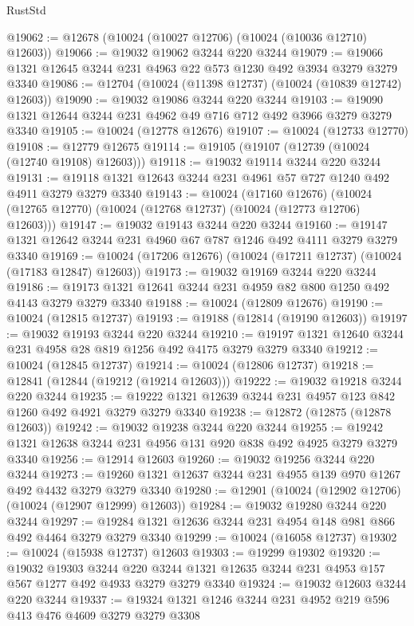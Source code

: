 \begin{lexlean}{RustStd}
\begin{coremodule}
{\begin{coremodule}
{{{{{{{{{{{{{{{{{{{{{{{{{{@19062 := @12678 (@10024 (@10027 @12706) (@10024 (@10036 @12710) @12603))
@19066 := @19032 @19062 @3244 @220 @3244
@19079 := @19066 @1321 @12645 @3244 @231 @4963 @22 @573 @1230 @492 @3934 @3279 @3279 @3340
@19086 := @12704 (@10024 (@11398 @12737) (@10024 (@10839 @12742) @12603))
@19090 := @19032 @19086 @3244 @220 @3244
@19103 := @19090 @1321 @12644 @3244 @231 @4962 @49 @716 @712 @492 @3966 @3279 @3279 @3340
@19105 := @10024 (@12778 @12676)
@19107 := @10024 (@12733 @12770)
@19108 := @12779 @12675
@19114 := @19105 (@19107 (@12739 (@10024 (@12740 @19108) @12603)))
@19118 := @19032 @19114 @3244 @220 @3244
@19131 := @19118 @1321 @12643 @3244 @231 @4961 @57 @727 @1240 @492 @4911 @3279 @3279 @3340
@19143 := @10024
    (@17160 @12676)
    (@10024 (@12765 @12770) (@10024 (@12768 @12737) (@10024 (@12773 @12706) @12603)))
@19147 := @19032 @19143 @3244 @220 @3244
@19160 := @19147 @1321 @12642 @3244 @231 @4960 @67 @787 @1246 @492 @4111 @3279 @3279 @3340
@19169 := @10024 (@17206 @12676) (@10024 (@17211 @12737) (@10024 (@17183 @12847) @12603))
@19173 := @19032 @19169 @3244 @220 @3244
@19186 := @19173 @1321 @12641 @3244 @231 @4959 @82 @800 @1250 @492 @4143 @3279 @3279 @3340
@19188 := @10024 (@12809 @12676)
@19190 := @10024 (@12815 @12737)
@19193 := @19188 (@12814 (@19190 @12603))
@19197 := @19032 @19193 @3244 @220 @3244
@19210 := @19197 @1321 @12640 @3244 @231 @4958 @28 @819 @1256 @492 @4175 @3279 @3279 @3340
@19212 := @10024 (@12845 @12737)
@19214 := @10024 (@12806 @12737)
@19218 := @12841 (@12844 (@19212 (@19214 @12603)))
@19222 := @19032 @19218 @3244 @220 @3244
@19235 := @19222 @1321 @12639 @3244 @231 @4957 @123 @842 @1260 @492 @4921 @3279 @3279 @3340
@19238 := @12872 (@12875 (@12878 @12603))
@19242 := @19032 @19238 @3244 @220 @3244
@19255 := @19242 @1321 @12638 @3244 @231 @4956 @131 @920 @838 @492 @4925 @3279 @3279 @3340
@19256 := @12914 @12603
@19260 := @19032 @19256 @3244 @220 @3244
@19273 := @19260 @1321 @12637 @3244 @231 @4955 @139 @970 @1267 @492 @4432 @3279 @3279 @3340
@19280 := @12901 (@10024 (@12902 @12706) (@10024 (@12907 @12999) @12603))
@19284 := @19032 @19280 @3244 @220 @3244
@19297 := @19284 @1321 @12636 @3244 @231 @4954 @148 @981 @866 @492 @4464 @3279 @3279 @3340
@19299 := @10024 (@16058 @12737)
@19302 := @10024 (@15938 @12737) @12603
@19303 := @19299 @19302
@19320 := @19032
    @19303
    @3244
    @220
    @3244
    @1321
    @12635
    @3244
    @231
    @4953
    @157
    @567
    @1277
    @492
    @4933
    @3279
    @3279
    @3340
@19324 := @19032 @12603 @3244 @220 @3244
@19337 := @19324 @1321 @1246 @3244 @231 @4952 @219 @596 @413 @476 @4609 @3279 @3279 @3308
}}}}}}}}}}}}}}}}}}}}}}}}}}
\end{coremodule}}
\end{coremodule}
\end{lexlean}
